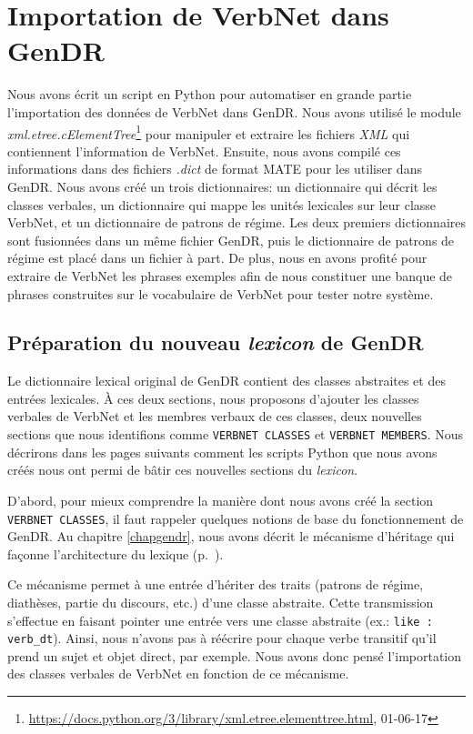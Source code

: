 
\chapter{Importation de VerbNet dans GenDR}\label{ch:python}

Nous avons écrit un script en Python pour automatiser en grande partie l'importation des données de VerbNet dans GenDR. Nous avons utilisé le module \emph{xml.etree.cElementTree}\footnote{\url{https://docs.python.org/3/library/xml.etree.elementtree.html}, 01-06-17} pour manipuler et extraire les fichiers \emph{XML} qui contiennent l'information de VerbNet. Ensuite, nous avons compilé ces informations dans des fichiers \emph{.dict} de format MATE pour les utiliser dans GenDR. Nous avons créé un trois dictionnaires: un dictionnaire qui décrit les classes verbales, un dictionnaire qui mappe les unités lexicales sur leur classe VerbNet, et un dictionnaire de patrons de régime. Les deux premiers dictionnaires sont fusionnées dans un même fichier GenDR, puis le dictionnaire de patrons de régime est placé dans un fichier à part. De plus, nous en avons profité pour extraire de VerbNet les phrases exemples afin de nous constituer une banque de phrases construites sur le vocabulaire de VerbNet pour tester notre système.
 
\section{Préparation du nouveau \emph{lexicon} de GenDR}

Le dictionnaire lexical original de GenDR contient des classes abstraites et des entrées lexicales. À ces deux sections, nous proposons d'ajouter les classes verbales de VerbNet et les membres verbaux de ces classes, deux nouvelles sections que nous identifions comme \texttt{VERBNET CLASSES} et \texttt{VERBNET MEMBERS}. Nous décrirons dans les pages suivants comment les scripts Python que nous avons créés nous ont permi de bâtir ces nouvelles sections du \emph{lexicon}.

D'abord, pour mieux comprendre la manière dont nous avons créé la section \texttt{VERBNET CLASSES}, il faut rappeler quelques notions de base du fonctionnement de GenDR. Au chapitre \ref{chapgendr}, nous avons décrit le mécanisme d'héritage qui façonne l'architecture du lexique (p.~\pageref{sec:dictio}). 

Ce mécanisme permet à une entrée d'hériter des traits (patrons de régime, diathèses, partie du discours, etc.) d'une classe abstraite. Cette transmission s'effectue en faisant pointer une entrée vers une classe abstraite (ex.: \texttt{like : verb\_dt}). Ainsi, nous n'avons pas à réécrire pour chaque verbe transitif qu'il prend un sujet et objet direct, par exemple. Nous avons donc pensé l'importation des classes verbales de VerbNet en fonction de ce mécanisme.  

